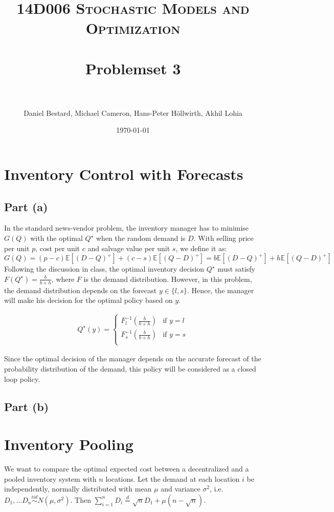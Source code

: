 \documentclass[11pt, oneside]{article}   	%
\title{
\normalfont \normalsize
\textsc{14D006 Stochastic Models and Optimization} \\ [25pt] %
\horrule{0.5pt} \\[0.4cm] %
\huge Problemset 3\\ %
\horrule{2pt} \\[0.5cm] %
}
\author{Daniel Bestard, Michael Cameron, Hans-Peter H{\"o}llwirth, Akhil Lohia} %
\date{\normalsize\today} %
\begin{document}
\maketitle


\section{Inventory Control with Forecasts}

\subsection{Part (a)}
In the standard news-vendor problem, the inventory manager has to minimise $G(Q)$ with the optimal $Q^{\star}$ when the random demand is $D$. With selling price per unit $p$, cost per unit $c$ and salvage value per unit $s$, we define it as:
\[
G(Q) =(p-c) \mathbb{E}[(D-Q)^+] + (c-s)\mathbb{E}[(Q-D)^+] =b \mathbb{E}[(D-Q)^+] + h\mathbb{E}[(Q-D)^+]
\]
Following the discussion in class, the optimal inventory decision $Q^{\star}$ must satisfy $F(Q^{\star}) = \frac{b}{b+h}$, where $F$ is the demand distribution.
However, in this problem, the demand distribution depends on the forecast $y \in \{l, s\}$. Hence, the manager will make his decision for the optimal policy based on $y$.

\begin{align*}
Q^{\star}(y) =
\begin{cases}
F_l^{-1} \left( \frac {b}{b+h}\right) & \text{if }y=l\\
F_s^{-1} \left( \frac {b}{b+h}\right) & \text{if }y=s\\
\end{cases}
\end{align*}

Since the optimal decision of the manager depends on the accurate forecast of the probability distribution of the demand, this policy will be considered as a closed loop policy.

\subsection{Part (b)}

\section{Inventory Pooling}
We want to compare the optimal expected cost between a decentralized and a pooled inventory system with $n$ locations. Let the demand at each location $i$ be independently, normally distributed with mean $\mu$ and variance $\sigma^2$, i.e. $D_1,...D_n \stackrel{iid}{\sim} N(\mu, \sigma^2)$. Then $\sum_{i=1}^n D_i \stackrel{d}{=} \sqrt{n}D_1 + \mu (n-\sqrt{n})$. \\
\end{document}

